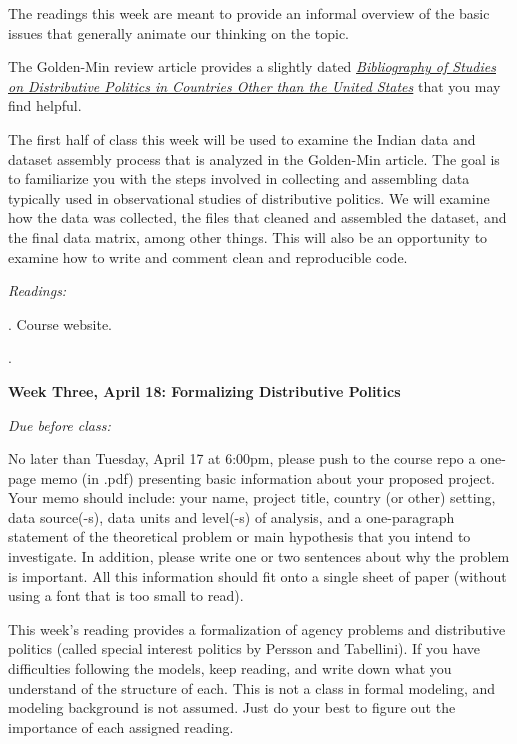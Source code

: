 \documentclass[11pt]{article}
\begin{document}
The readings this week are meant to provide an informal overview of the basic issues that generally animate our thinking on the topic.


The Golden-Min review article provides a slightly dated \href{http://www.annualreviews.org/doi/suppl/10.1146/annurev-polisci-052209-121553/suppl_file/pl16_golden_supmat_biblio.pdf}{\textit{Bibliography of Studies on Distributive Politics in Countries
Other than the United States}} that you may find helpful. 

The first half of class this week will be used to examine the Indian data and dataset assembly process that is analyzed in the Golden-Min article. The
goal is to familiarize you with the steps involved in collecting and assembling data typically used in observational studies of distributive politics. We will examine how the data was collected, the files that cleaned and assembled the dataset, and the final data matrix, among other things.  This will also be an opportunity to examine how to write and comment clean and reproducible code. 

\textit{Readings:}

. Course website. 

\href{DOI: 10.1146/annurev-polisci-052209-121553}{}.

\textbf{Week Three, April 18: Formalizing Distributive Politics}

\textit{Due before class:}

No later than Tuesday, April 17 at 6:00pm, please push to the course repo
a one-page memo (in .pdf) presenting basic information about your proposed project. Your memo should include: 
your name, project title, country (or other) setting, data source(-s), data units and level(-s) of analysis,
and a one-paragraph statement of the theoretical problem or main
hypothesis that you intend
to investigate. In addition, please write one or two sentences about why the problem is important. 
All this information should fit onto a single sheet of paper
(without using a font that is too small to read). 

This week's reading provides a formalization of agency problems and distributive politics (called special interest
politics by Persson and Tabellini). If you have difficulties following the models, keep reading, and write down what
you understand of the structure of each. This is not a class in formal modeling, and modeling background is not assumed. Just do your best to figure out the importance of each assigned reading.
\end{document}

